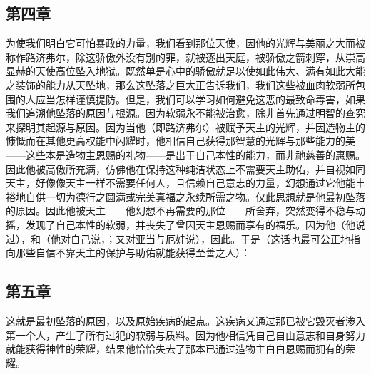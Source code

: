 
\subsection{第四章}

\par

为使我们明白它可怕暴政的力量，我们看到那位天使，因他的光辉与美丽之大而被称作路济弗尔，除这骄傲外没有别的罪，就被逐出天庭，被骄傲之箭刺穿，从崇高显赫的天使高位坠入地狱。既然单是心中的骄傲就足以使如此伟大、满有如此大能之装饰的能力从天坠地，那么这坠落之巨大正告诉我们，我们这些被血肉软弱所包围的人应当怎样谨慎提防。但是，我们可以学习如何避免这恶的最致命毒害，如果我们追溯他坠落的原因与根源。因为软弱永不能被治愈，除非首先通过明智的查究来探明其起源与原因。因为当他（即路济弗尔）被赋予天主的光辉，并因造物主的慷慨而在其他更高权能中闪耀时，他相信自己获得那智慧的光辉与那些能力的美——这些本是造物主恩赐的礼物——是出于自己本性的能力，而非祂慈善的惠赐。因此他被高傲所充满，仿佛他在保持这种纯洁状态上不需要天主助佑，并自视如同天主，好像像天主一样不需要任何人，且信赖自己意志的力量，幻想通过它他能丰裕地自供一切为德行之圆满或完美真福之永续所需之物。仅此思想就是他最初坠落的原因。因此他被天主——他幻想不再需要的那位——所舍弃，突然变得不稳与动摇，发现了自己本性的软弱，并丧失了曾因天主恩赐而享有的福乐。因为他（他说过），和（他对自己说，；又对亚当与厄娃说），因此。于是（这话也最可公正地指向那些自信不靠天主的保护与助佑就能获得至善之人）：\par


\subsection{第五章}

\par

这就是最初坠落的原因，以及原始疾病的起点。这疾病又通过那已被它毁灭者渗入第一个人，产生了所有过犯的软弱与质料。因为他相信凭自己自由意志和自身努力就能获得神性的荣耀，结果他恰恰失去了那本已通过造物主白白恩赐而拥有的荣耀。\par

